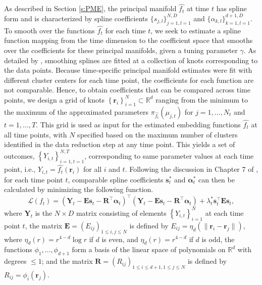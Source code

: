 \documentclass[11pt,reqno]{article}
\newcommand{\T}{\intercal}
\theoremstyle{definition}
\begin{document}
As described in Section \ref{s:PME}, the principal manifold $\widehat{f_t}$ at time $t$ has spline form and is characterized by spline coefficients $\{s_{j, l}\}_{j=1, l=1}^{N, D}$ and $\{\alpha_{k, l}\}_{k=1, l=1}^{d+1, D}$. To smooth over the functions $\widehat{f_t}$ for each time $t$, we seek to estimate a spline function mapping from the time dimension to the coefficient space that smooths over the coefficients for these principal manifolds, given a tuning parameter $\gamma$. As detailed by \cite{greenSilverman1994}, smoothing splines are fitted at a collection of knots corresponding to the data points. Because time-specific principal manifold estimates were fit with different cluster centers for each time point, the coefficients for each function are not comparable. Hence, to obtain coefficients that can be compared across time points, we design a grid of knots $\left\{\mathbf{r}_i\right\}_{i=1}^{N} \subset \mathbb{R}^d$ ranging from the minimum to the maximum of the approximated parameters $\pi_{\widehat{f_t}}(\mu_{j, t})$ for $j = 1, \dots, N_t$ and $t = 1, \dots, T$. This grid is used as input for the estimated embedding functions $\widehat{f_t}$ at all time points, with $N$ specified based on the maximum number of clusters identified in the data reduction step at any time point. This yields a set of outcomes, $\left\{Y_{i,t}\right\}_{i=1, t = 1}^{N, T}$, corresponding to same parameter values at each time point, i.e., $Y_{i,t}=\widehat{f_t}(\mathbf{r}_i)$ for all $i$ and $t$. Following the discussion in Chapter 7 of \cite{greenSilverman1994}, for each time point $t$, comparable spline coefficients $\mathbf{s}_t^*$ and $\mathbf{\alpha}_t^*$ can then be calculated by minimizing the following function.
\begin{equation}\label{eq:splineL}
    \mathcal{L}(f_t) = (\mathbf{Y}_t - \mathbf{E}\mathbf{s}_t - \mathbf{R}^\T\mathbf{\alpha}_t)^\T(\mathbf{Y}_t - \mathbf{E}\mathbf{s}_t - \mathbf{R}^\T\mathbf{\alpha}_t) + \lambda_t^*\mathbf{s}_t^\T \mathbf{E}\mathbf{s}_t,
\end{equation}
where $\mathbf{Y}_t$ is the $N \times D$ matrix consisting of elements $\left\{Y_{i,t}\right\}_{i=1}^{N}$ at each time point $t$, the matrix $\mathbf{E}=(E_{ij})_{1\le i,j\le N}$ is defined by $E_{ij} = \eta_{d}(\|\mathbf{r}_i - \mathbf{r}_j\|)$, where $\eta_{d}(r) = r^{4 - d}\log r$ if $d$ is even, and $\eta_d(r) = r^{4-d}$ if $d$ is odd, the functions $\phi_1,\ldots,\phi_{d+1}$ form a basis of the linear space of polynomials on $\mathbb{R}^d$ with degrees $\le1$; and the matrix $\mathbf{R}=(R_{ij})_{1\le i\le d+1,1\le j\le N}$ is defined by $R_{ij} = \phi_i(\mathbf{r}_j)$.
\end{document}
